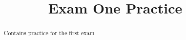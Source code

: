 \documentclass{xourse}
\title{Exam One Practice}
\begin{document}
\begin{abstract}
Contains practice for the first exam
\end{abstract}
\maketitle

%   


\end{document}
